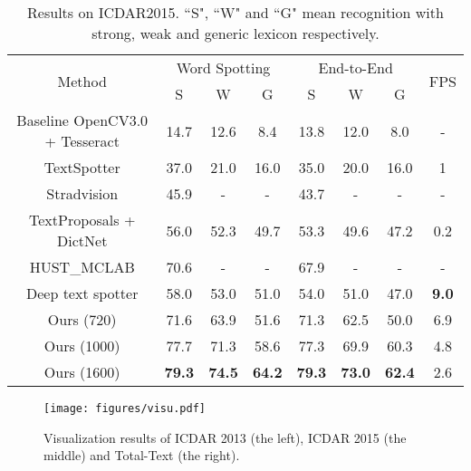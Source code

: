 \documentclass[runningheads]{llncs}
\begin{document}
\begin{table}[ht]
\begin{centering}
\caption{Results on ICDAR2015. ``S", ``W" and ``G" mean recognition with strong, weak and generic lexicon respectively.}
\label{tab_icdar2015}
\begin{tabular}{|c|c|c|c|c|c|c|c|}
\hline 
\multirow{2}{*}{Method} & \multicolumn{3}{c|}{Word Spotting} & \multicolumn{3}{c|}{End-to-End} & \multirow{2}{*}{FPS}\tabularnewline
\cline{2-7} 
 & S & W & G & S & W & G & \tabularnewline
\hline 
\hline
Baseline OpenCV3.0 + Tesseract\cite{karatzas2015icdar}  & 14.7 & 12.6 & 8.4 & 13.8  & 12.0  & 8.0 & - \tabularnewline
\hline 
TextSpotter \cite{neumann2016real} & 37.0  & 21.0 & 16.0 & 35.0 & 20.0 & 16.0 & 1 \tabularnewline
\hline 
Stradvision \cite{karatzas2015icdar} & 45.9  & - & - & 43.7 & - & - & - \tabularnewline
\hline 
TextProposals + DictNet \cite{gomez2017textproposals,Jaderberg14c} & 56.0 & 52.3 & 49.7 & 53.3 & 49.6 & 47.2 &  0.2 \tabularnewline
\hline 
HUST\_MCLAB \cite{shi2017detecting,shi2017end} & 70.6 & - & - & 67.9 & - & - &  - \tabularnewline
 \hline 
Deep text spotter \cite{Busta_2017_ICCV} & 58.0 & 53.0 & 51.0 & 54.0 & 51.0 & 47.0 & \textbf{9.0} \tabularnewline
\hline 
\hline
 Ours (720)  &71.6  &63.9  &51.6  &71.3  &62.5  &50.0  &6.9   \tabularnewline
\hline
 Ours (1000)  &77.7  &71.3  &58.6  &77.3  &69.9  &60.3  &4.8   \tabularnewline
\hline
 Ours (1600)  &\textbf{79.3}  &\textbf{74.5}  &\textbf{64.2}  &\textbf{79.3}  &\textbf{73.0}  &\textbf{62.4}  &2.6   \tabularnewline
\hline
\end{tabular}
\par\end{centering}
\end{table}

\begin{figure}[!tbp]
\begin{center}
\texttt{[image: figures/visu.pdf]}
\end{center}
\caption{Visualization results of ICDAR 2013 (the left), ICDAR 2015 (the middle) and Total-Text (the right).}
\label{fig:visu}
\end{figure}
\end{document}
